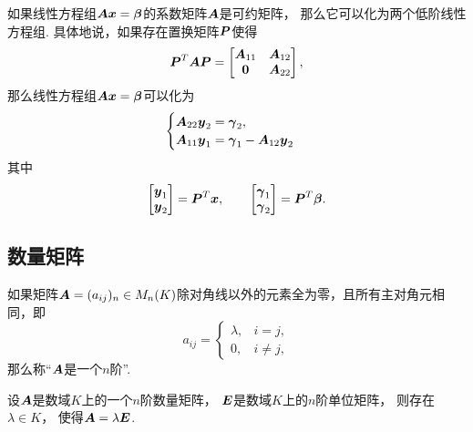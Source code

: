 \begin{remark}
如果线性方程组\(\boldsymbol{A} \boldsymbol{x} = \boldsymbol\beta\)的系数矩阵\(\boldsymbol{A}\)是可约矩阵，
那么它可以化为两个低阶线性方程组.
具体地说，如果存在置换矩阵\(\boldsymbol{P}\)使得\begin{equation*}
	\boldsymbol{P}^T \boldsymbol{A} \boldsymbol{P}
	= \begin{bmatrix}
		\boldsymbol{A}_{11} & \boldsymbol{A}_{12} \\
		\boldsymbol0 & \boldsymbol{A}_{22} \\
	\end{bmatrix},
\end{equation*}
那么线性方程组\(\boldsymbol{A} \boldsymbol{x} = \boldsymbol\beta\)可以化为\begin{equation*}
	\begin{cases}
		\boldsymbol{A}_{22} \boldsymbol{y}_2 = \boldsymbol\gamma_2, \\
		\boldsymbol{A}_{11} \boldsymbol{y}_1 = \boldsymbol\gamma_1 - \boldsymbol{A}_{12} \boldsymbol{y}_2
	\end{cases}
\end{equation*}
其中\begin{equation*}
	\begin{bmatrix}
		\boldsymbol{y}_1 \\
		\boldsymbol{y}_2
	\end{bmatrix}
	= \boldsymbol{P}^T \boldsymbol{x},
	\qquad
	\begin{bmatrix}
		\boldsymbol\gamma_1 \\
		\boldsymbol\gamma_2
	\end{bmatrix}
	= \boldsymbol{P}^T \boldsymbol\beta.
\end{equation*}
\end{remark}

\subsection{数量矩阵}
\begin{definition}
如果矩阵\(\boldsymbol{A}=(a_{ij})_n \in M_n(K)\)除对角线以外的元素全为零，且所有主对角元相同，即\begin{equation*}
	a_{ij} = \left\{ \begin{array}{cl}
		\lambda, & i = j, \\
		0, & i \neq j,
	\end{array} \right.
\end{equation*}
那么称“\(\boldsymbol{A}\)是一个\(n\)阶”.
\end{definition}

\begin{proposition}
设\(\boldsymbol{A}\)是数域\(K\)上的一个\(n\)阶数量矩阵，
\(\boldsymbol{E}\)是数域\(K\)上的\(n\)阶单位矩阵，
则存在\(\lambda \in K\)，
使得\(\boldsymbol{A} = \lambda \boldsymbol{E}\).
\end{proposition}

